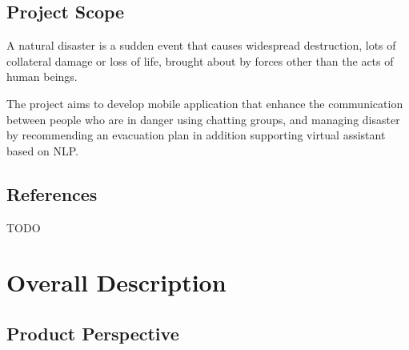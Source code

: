\documentclass{scrreprt}
\begin{document}
\section{Project Scope}

A natural disaster is a sudden event that causes widespread destruction, lots of collateral damage or loss of life, brought about by forces other than the acts of human beings.

The project aims to develop mobile application that enhance the
communication between people who are in danger using chatting groups, and managing disaster by recommending an evacuation plan in addition supporting virtual assistant based on NLP.

\section{References}

TODO



\chapter{Overall Description}

\section{Product Perspective}
\end{document}
